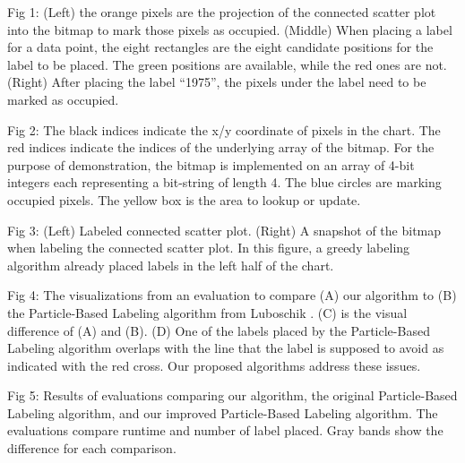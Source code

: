 Fig 1:
(Left) the orange pixels are the projection of the connected scatter plot into the bitmap to mark those pixels as occupied.
(Middle) When placing a label for a data point, the eight rectangles are the eight candidate positions for the label to be placed.
The green positions are available, while the red ones are not.
(Right) After placing the label ``1975'', the pixels under the label need to be marked as occupied.

Fig 2:
The black indices indicate the x/y coordinate of pixels in the chart.
The red indices indicate the indices of the underlying array of the bitmap.
For the purpose of demonstration, the bitmap is implemented on an array of 4-bit integers each representing a bit-string of length 4.
The blue circles are marking occupied pixels.
The yellow box is the area to lookup or update.

Fig 3:
(Left) Labeled connected scatter plot.
(Right) A snapshot of the bitmap when labeling the connected scatter plot. In this figure, a greedy labeling algorithm already placed labels in the left half of the chart.

Fig 4:
The visualizations from an evaluation to compare (A) our algorithm to (B) the Particle-Based Labeling algorithm from Luboschik \ea \cite{luboschik:particle}.
(C) is the visual difference of (A) and (B).
(D) One of the labels placed by the Particle-Based Labeling algorithm overlaps with the line that the label is supposed to avoid as indicated with the red cross.
Our proposed algorithms address these issues.

Fig 5:
Results of evaluations comparing our algorithm, the original Particle-Based Labeling algorithm, and our improved Particle-Based Labeling algorithm.
The evaluations compare runtime and number of label placed.
Gray bands show the difference for each comparison.
